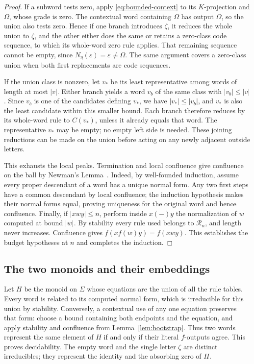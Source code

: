 \begin{proof}
If a subword tests zero, apply \eqref{eq:bounded-context} to its
$K$-projection and $\Omega$, whose grade is zero.  The contextual
word containing $\Omega$ has output $\Omega$, so the union also
tests zero.  Hence if one branch introduces $\zeta$, it reduces the
whole union to $\zeta$, and the other either does the same or retains
a zero-class code sequence, to which its whole-word zero rule applies.
That remaining sequence cannot be empty, since
$N_\eta(\varepsilon)=\varepsilon\ne\Omega$.
The same argument covers a zero-class union when both first
replacements are code sequences.

If the union class is nonzero, let $v_*$ be its least representative
among words of length at most $|v|$.  Either branch yields a word
$v_b$ of the same class with $|v_b|\le|v|$.  Since $v_b$ is one of
the candidates defining $v_*$, we have
$|v_*|\le|v_b|$, and $v_*$ is also the least candidate within this
smaller bound.  Each branch therefore reduces by its whole-word rule
to $C(v_*)$, unless it already equals that word.  The representative
$v_*$ may be empty; no empty left side is needed.  These joining
reductions can be made on the union before acting on any newly
adjacent outside letters.

This exhausts the local peaks.  Termination and local confluence give
confluence on the ball by Newman's Lemma~\cite{Newman42}.
Indeed, by well-founded induction, assume every proper descendant of
a word has a unique normal form.  Any two first steps have a common
descendant by local confluence; the induction hypothesis makes their
normal forms equal, proving uniqueness for the original word and
hence confluence.  Finally, if $|xwy|\le n$,
perform inside $x(-)y$ the normalization of $w$ computed at bound
$|w|$.  By stability every rule used belongs to $\mathcal R_n$, and
length never increases.  Confluence gives
$f(xf(w)y)=f(xwy)$.  This establishes the budget hypotheses at $n$
and completes the induction.
\end{proof}

\subsection{The two monoids and their embeddings}

Let $H$ be the monoid on $\Sigma$ whose equations are the union of
all the rule tables.  Every word is related to its computed normal
form, which is irreducible for this union by stability.
Conversely, a contextual use of any one
equation preserves that form: choose a bound containing both
endpoints and the equation, and apply stability and confluence from
Lemma~\ref{lem:bootstrap}.  Thus two words represent the same element
of $H$ if and only if their literal $f$-outputs agree.  This proves
decidability.  The empty word and the single letter $\zeta$ are
distinct irreducibles; they represent the identity and the absorbing
zero of $H$.

